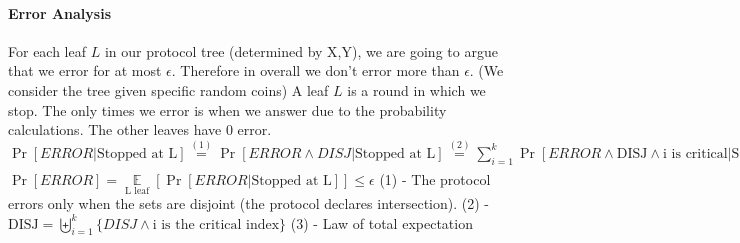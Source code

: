 \documentclass{article}
\begin{document}
\paragraph{Error Analysis}
For each leaf $L$ in our protocol tree (determined by X,Y), we are going to argue that we error for at most $\epsilon$. Therefore in overall we don't error more than $\epsilon$. (We consider the tree given specific random coins) \newline
A leaf $L$ is a round in which we stop. \newline
The only times we error is when we answer due to the probability calculations. The other leaves have 0 error.\newline
$\Pr[ERROR | \text{Stopped at L}] \overset{(1)}{=} \Pr[ERROR \land DISJ | \text{Stopped at L}] \overset{(2)}{=} \sum\limits_{i=1}^k \Pr[ERROR \land \text{DISJ} \land \text{i is critical}| \text{Stopped at L}] \overset{(3)}{=} \sum\limits_{i=1}^k \underset{X_i=x_i}{\mathop{\mathbb{E}}}\Pr[ERROR \land \text{DISJ}\land \text{i is critical}| \text{Stopped at L} \land X_i=x_i] \leq \sum\limits_{i=1}^k \underset{X_i=x_i}{\mathop{\mathbb{E}}}[\frac{\epsilon}{k}] = \sum\limits_{i=1}^k \frac{\epsilon}{k} = \epsilon$ \newline
\newline
$\Pr[ERROR] = \underset{\text{L leaf}}{\mathop{\mathbb{E}}} [\Pr[ERROR | \text{Stopped at L}] ] \leq \epsilon $ \newline
(1) - The protocol errors only when the sets are disjoint (the protocol declares intersection). \newline
(2) - $  \text{DISJ} = \biguplus_{i=1}^{k}\{DISJ \land \text{i is the critical index} \} $ \newline
(3) - Law of total expectation
\end{document}
